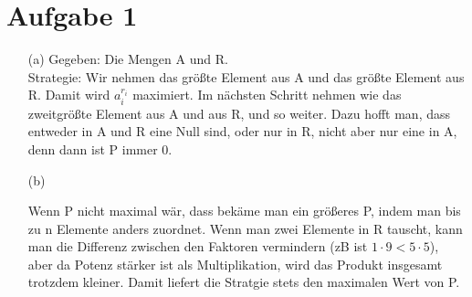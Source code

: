 \documentclass{article}
\begin{document}
\section*{Aufgabe 1}

\begin{enumerate}
\item[(a)]
Gegeben: Die Mengen A und R. \\
Strategie: Wir nehmen das größte Element aus A und das größte Element aus R. 
Damit wird $a_i^{r_i}$ maximiert. Im nächsten Schritt nehmen wie das 
zweitgrößte Element aus A und aus R, und so weiter.
Dazu hofft man, dass entweder in A und R eine Null sind, oder nur in R, 
nicht aber nur eine in A, denn dann ist P immer 0.
 
\item[(b)]

Wenn P nicht maximal wär, dass bekäme man ein größeres P, indem man bis 
zu n Elemente anders zuordnet. Wenn man zwei Elemente in R tauscht, kann man 
die Differenz zwischen den Faktoren vermindern (zB ist $1 \cdot 9 < 5 
\cdot 5$), aber da Potenz stärker ist als Multiplikation, wird das Produkt 
insgesamt trotzdem kleiner.
Damit liefert die Stratgie stets den maximalen Wert von P.

\end{enumerate}
\end{document}
